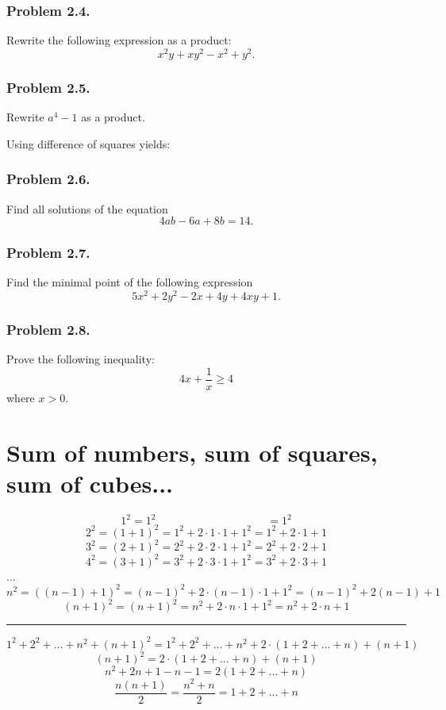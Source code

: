 \documentclass{article}
\begin{document}
\subsubsection{Problem 2.4.}
Rewrite the following expression as a product:
\begin{equation}
    x^2y+xy^2-x^2+y^2.
\end{equation}

\subsubsection{Problem 2.5.}
Rewrite $a^4 - 1$ as a product.

Using difference of squares yields:

\subsubsection{Problem 2.6.}
Find all solutions of the equation
\begin{equation}
    4ab-6a+8b = 14.
\end{equation}

\subsubsection{Problem 2.7.}
Find the minimal point of the following expression
\[
5x^2 + 2y^2 -2x +4y + 4xy + 1.
\]

\subsubsection{Problem 2.8.}
Prove the following inequality:
\[
4x+\frac{1}{x} \ge 4
\]
where $x > 0$.

\section{Sum of numbers, sum of squares, sum of cubes...}
\[
1^2 = 1^2 \qquad\qquad\qquad\qquad\qquad =1^2
\]
\[
2^2 = (1 + 1)^2 = 1^2 + 2 \cdot 1 \cdot 1 + 1^2 = 1^2 + 2 \cdot 1 + 1
\]
\[
3^2 = (2 + 1)^2 = 2^2 + 2\cdot 2 \cdot 1 + 1^2 = 2^2 + 2 \cdot 2 + 1
\]
\[
4^2 = (3+1)^2 = 3^2 + 2\cdot3\cdot1 + 1^2 = 3^2 + 2\cdot 3 + 1
\]
...
\[
n^2 = ((n-1) + 1)^2 = (n-1)^2 + 2\cdot(n-1)\cdot1 + 1^2 = (n-1)^2 + 2(n-1) + 1
\]
\[
(n+1)^2 = (n+1)^2 = n^2 + 2 \cdot n \cdot 1 +1^2 = n^2 + 2\cdot n + 1
\]

\hrule

\[
1^2 + 2^2 + ... + n^2 + (n+1)^2 = 1^2 + 2^2 + ... + n^2 + 2\cdot(1 + 2 + ... + n) + (n+1)
\]
\[
(n+1)^2 = 2\cdot(1 + 2 + ... + n) + (n + 1)
\]
\[
n^2 + 2n + 1 - n - 1 = 2(1 + 2 + ... + n)
\]
\[
\frac{n(n+1)}{2} = \frac{n^2 + n}{2} = 1 + 2 + ... + n
\]
\end{document}
